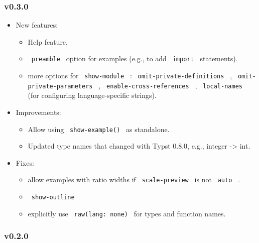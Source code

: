 \subsubsection{v0.3.0}\label{v0.3.0}

\begin{itemize}
\tightlist
\item
  New features:

  \begin{itemize}
  \tightlist
  \item
    Help feature.
  \item
    \texttt{\ preamble\ } option for examples (e.g., to add
    \texttt{\ import\ } statements).
  \item
    more options for \texttt{\ show-module\ } :
    \texttt{\ omit-private-definitions\ } ,
    \texttt{\ omit-private-parameters\ } ,
    \texttt{\ enable-cross-references\ } , \texttt{\ local-names\ } (for
    configuring language-specific strings).
  \end{itemize}
\item
  Improvements:

  \begin{itemize}
  \tightlist
  \item
    Allow using \texttt{\ show-example()\ } as standalone.
  \item
    Updated type names that changed with Typst 0.8.0, e.g., integer
    -\textgreater{} int.
  \end{itemize}
\item
  Fixes:

  \begin{itemize}
  \tightlist
  \item
    allow examples with ratio widths if \texttt{\ scale-preview\ } is
    not \texttt{\ auto\ } .
  \item
    \texttt{\ show-outline\ }
  \item
    explicitly use \texttt{\ raw(lang:\ none)\ } for types and function
    names.
  \end{itemize}
\end{itemize}

\subsubsection{v0.2.0}\label{v0.2.0}

